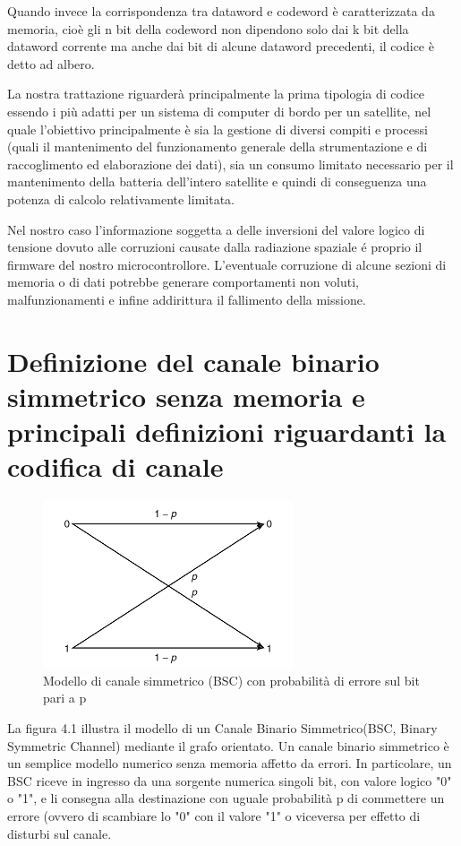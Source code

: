 \documentclass[LaM,binding=0.6cm,oneside]{../sapthesis}
\begin{document}
Quando invece la corrispondenza tra dataword e codeword è caratterizzata da memoria, cioè gli n bit della codeword non dipendono solo dai k bit della dataword corrente ma anche dai bit di alcune dataword precedenti, il codice è detto ad albero.

La nostra trattazione riguarderà principalmente la prima tipologia di codice essendo i più adatti per un sistema di computer di bordo per un satellite, nel quale l'obiettivo principalmente è sia la gestione di diversi compiti e processi (quali il mantenimento del funzionamento generale della strumentazione e di raccoglimento ed elaborazione dei dati), sia un consumo limitato necessario per il mantenimento della batteria dell'intero satellite e quindi di conseguenza una potenza di calcolo relativamente limitata.

\newline
Nel nostro caso l'informazione soggetta a delle inversioni del valore logico di tensione dovuto alle corruzioni causate dalla radiazione spaziale é proprio il firmware del nostro microcontrollore.
L'eventuale corruzione di alcune sezioni di memoria o di dati potrebbe generare comportamenti non voluti, malfunzionamenti e infine addirittura il fallimento della missione.

\section{Definizione del canale binario simmetrico senza memoria e principali definizioni riguardanti la codifica di canale}

\begin{figure}[htbp]
\centerline{\includegraphics[scale=0.8]{examples/canale-binario.png}}
\caption{Modello di canale simmetrico (BSC) con probabilità di errore sul bit pari a p}
\label{fig}
\end{figure}
\newline
La figura 4.1 illustra il modello di un Canale Binario Simmetrico(BSC, Binary Symmetric Channel) mediante il grafo orientato. Un canale binario simmetrico è un semplice modello numerico senza memoria affetto da errori. In particolare, un BSC riceve in ingresso da una sorgente numerica singoli bit, con valore logico "0" o "1", e li consegna alla destinazione con uguale probabilità p di commettere un errore (ovvero di scambiare lo "0" con il valore "1" o viceversa per effetto di disturbi sul canale. 
\end{document}
